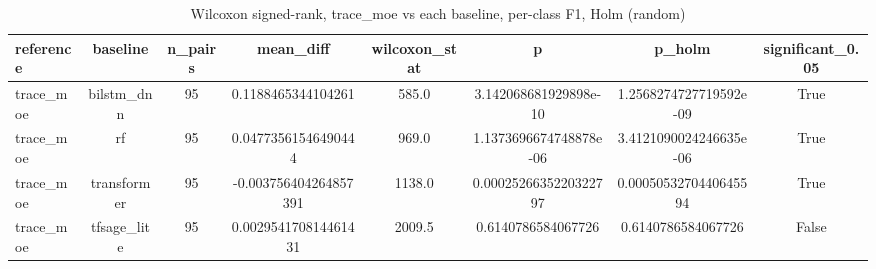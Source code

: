 \begin{table}[htbp]
\centering
\caption{Wilcoxon signed-rank, trace_moe vs each baseline, per-class F1, Holm (random)}
\label{tab:wilcoxon_trace_moe_vs_baselines_random}
\begin{tabular}{lccccccc}
\toprule
reference & baseline & n\_pairs & mean\_diff & wilcoxon\_stat & p & p\_holm & significant\_0.05 \\
\midrule
trace\_moe & bilstm\_dnn & 95 & 0.1188465344104261 & 585.0 & 3.142068681929898e-10 & 1.2568274727719592e-09 & True \\
trace\_moe & rf & 95 & 0.04773561546490444 & 969.0 & 1.1373696674748878e-06 & 3.4121090024246635e-06 & True \\
trace\_moe & transformer & 95 & -0.003756404264857391 & 1138.0 & 0.0002526635220322797 & 0.0005053270440645594 & True \\
trace\_moe & tfsage\_lite & 95 & 0.002954170814461431 & 2009.5 & 0.6140786584067726 & 0.6140786584067726 & False \\
\bottomrule
\end{tabular}
\end{table}